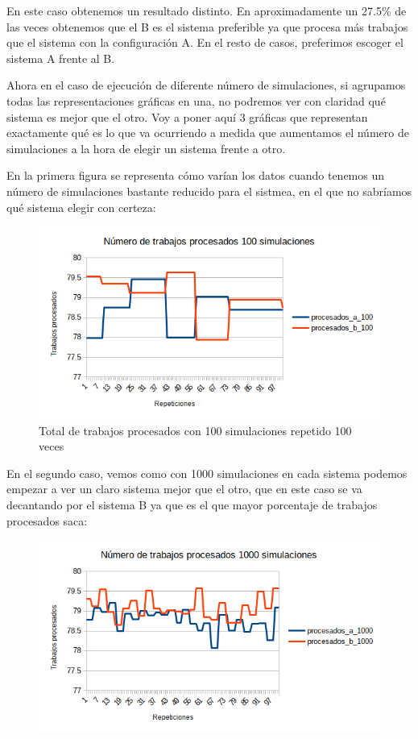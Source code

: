 \documentclass[11pt,a4paper]{report}
\begin{document}
En este caso obtenemos un resultado distinto. En aproximadamente un 27.5\% de las veces obtenemos que el B es el sistema preferible ya que procesa más trabajos que el sistema con la configuración A. En el resto de casos, preferimos escoger el sistema A frente al B.

Ahora en el caso de ejecución de diferente número de simulaciones, si agrupamos todas las representaciones gráficas en una, no podremos ver con claridad qué sistema es mejor que el otro. Voy a poner aquí 3 gráficas que representan exactamente qué es lo que va ocurriendo a medida que aumentamos el número de simulaciones a la hora de elegir un sistema frente a otro.

En la primera figura se representa cómo varían los datos cuando tenemos un número de simulaciones bastante reducido para el sistmea, en el que no sabríamos qué sistema elegir con certeza:

\begin{figure}[H]
\includegraphics[width=\textwidth]{img/cap-3/ttp_100.png}
\caption{Total de trabajos procesados con 100 simulaciones repetido 100 veces}
\label{}
\end{figure}

En el segundo caso, vemos como con 1000 simulaciones en cada sistema podemos empezar a ver un claro sistema mejor que el otro, que en este caso se va decantando por el sistema B ya que es el que mayor porcentaje de trabajos procesados saca:

\begin{figure}[H]
\includegraphics[width=\textwidth]{img/cap-3/ttp_1000.png}
\caption{}
\label{}
\end{figure}
\end{document}
